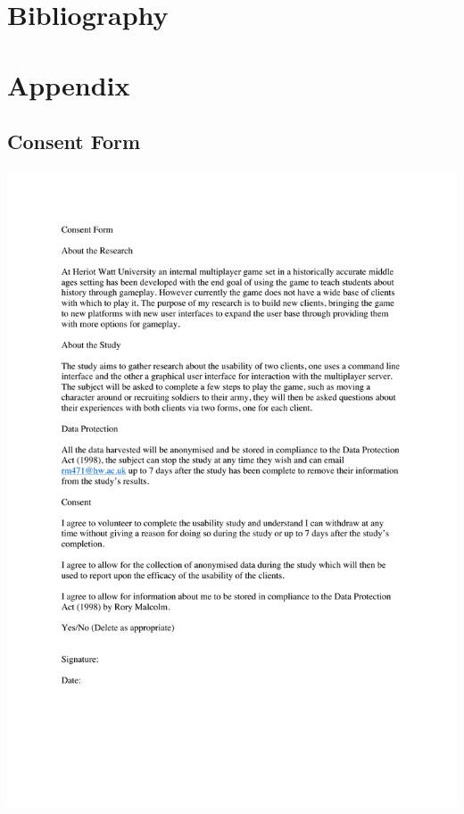 \documentclass{article}
\begin{document}
	\section{Bibliography}
	\printbibliography
	\newpage
	\section{Appendix}
	\subsection{Consent Form}	
	\includegraphics{consentform.pdf} 
\end{document}
